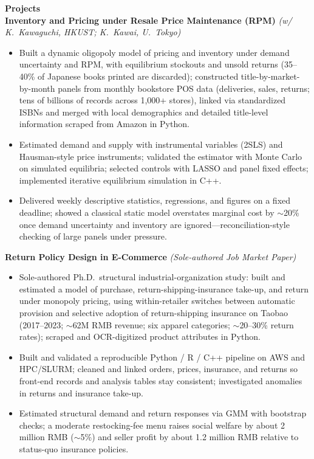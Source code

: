 \documentclass[11pt,letterpaper]{article}
\begin{document}
{\large \textbf{Projects}}\\[-0.5pt]
\textbf{Inventory and Pricing under Resale Price Maintenance (RPM)} \textit{(w/ K.\ Kawaguchi, HKUST; K.\ Kawai, U.\ Tokyo)}\\
\vspace{-6pt}
\begin{itemize}
  \item Built a dynamic oligopoly model of pricing and inventory under demand uncertainty and RPM, with equilibrium stockouts and unsold returns (35--40\% of Japanese books printed are discarded); constructed title-by-market-by-month panels from monthly bookstore POS data (deliveries, sales, returns; tens of billions of records across 1{,}000+ stores), linked via standardized ISBNs and merged with local demographics and detailed title-level information scraped from Amazon in Python.
  \item Estimated demand and supply with instrumental variables (2SLS) and Hausman-style price instruments; validated the estimator with Monte Carlo on simulated equilibria; selected controls with LASSO and panel fixed effects; implemented iterative equilibrium simulation in C++.
  \item Delivered weekly descriptive statistics, regressions, and figures on a fixed deadline; showed a classical static model overstates marginal cost by \(\sim\)20\% once demand uncertainty and inventory are ignored---reconciliation-style checking of large panels under pressure.
\end{itemize}
\vspace{-3pt}
\textbf{Return Policy Design in E-Commerce} \textit{(Sole-authored Job Market Paper)}\\
\vspace{-6pt}
\begin{itemize}
  \item Sole-authored Ph.D.\ structural industrial-organization study: built and estimated a model of purchase, return-shipping-insurance take-up, and return under monopoly pricing, using within-retailer switches between automatic provision and selective adoption of return-shipping insurance on Taobao (2017--2023; \(\sim\)62M RMB revenue; six apparel categories; \(\sim\)20--30\% return rates); scraped and OCR-digitized product attributes in Python.
  \item Built and validated a reproducible Python / R / C++ pipeline on AWS and HPC/SLURM; cleaned and linked orders, prices, insurance, and returns so front-end records and analysis tables stay consistent; investigated anomalies in returns and insurance take-up.
  \item Estimated structural demand and return responses via GMM with bootstrap checks; a moderate restocking-fee menu raises social welfare by about 2 million RMB (\(\sim\)5\%) and seller profit by about 1.2 million RMB relative to status-quo insurance policies.
\end{itemize}
\end{document}
